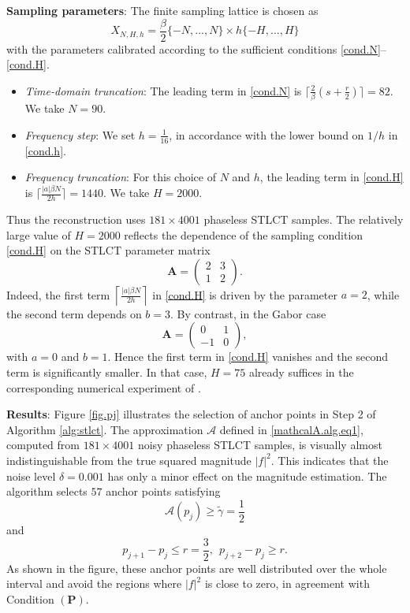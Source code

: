 \documentclass[11pt, reqno]{amsart}
\numberwithin{equation}{section}
\begin{document}
\medskip
\noindent\textbf{Sampling parameters}:  
The finite sampling lattice is chosen as 
$$X_{N,H,h} = \frac{\beta}{2}\{-N,\dots,N\} \times h\{-H,\dots,H\}$$
with the parameters calibrated according to the sufficient conditions
\eqref{cond.N}--\eqref{cond.H}.

\begin{itemize}
    

\item \emph{Time-domain truncation}: The leading term in \eqref{cond.N} is 
  $\lceil\frac{2}{\beta}(s+\frac{r}{2})\rceil = 82$. We take $N = 90$.

\item \emph{Frequency step}: We set $h = \frac{1}{16}$,
in accordance with  the lower bound on $1/h$ in \eqref{cond.h}.

\item \emph{Frequency truncation}: For this choice of $N$ and $h$, the leading term in \eqref{cond.H} is 
  $\lceil\frac{|a|\beta N}{2h}\rceil = 1440$. We take $H = 2000$.
\end{itemize}

Thus the reconstruction uses $181 \times 4001$ phaseless STLCT samples. 
The relatively large value of $H=2000$ reflects the dependence of the sampling condition \eqref{cond.H} on the STLCT parameter matrix 
$$\mathbf A=
\begin{pmatrix}
2 & 3\\
1 & 2
\end{pmatrix}.$$
 Indeed, the first term $\left\lceil \frac{|a|\beta N}{2h}\right\rceil$ in \eqref{cond.H} is driven by the parameter $a=2$, while the second term depends on $b=3$. By contrast, in the Gabor case
$$\mathbf A=
\begin{pmatrix}
0 & 1\\
-1 & 0
\end{pmatrix},$$
 with $a=0$ and $b=1$. Hence the first term in \eqref{cond.H} vanishes and the second term is significantly smaller. In that case, $H=75$ already suffices in the corresponding numerical experiment of \cite{grohs2024stable}.


\medskip
\noindent\textbf{Results}: Figure \ref{fig.pj} illustrates the selection of anchor points in Step 2 of Algorithm \ref{alg:stlct}. The approximation $\mathcal A$ defined in \eqref{mathcalA.alg.eq1}, computed from $181\times 4001$ noisy phaseless STLCT samples, is visually almost indistinguishable from the true squared magnitude $|f|^2$. This indicates that the noise level $\delta=0.001$ has only a minor effect on the magnitude estimation. The algorithm selects $57$ anchor points satisfying
$$\mathcal A(p_j)\ge \widetilde{\gamma}=\frac12$$
and
$$p_{j+1}-p_j\le r=\frac32, \ \  p_{j+2}-p_j\ge r. $$
As shown in the figure, these anchor points are well distributed over the whole interval and avoid the regions where $|f|^2$ is close to zero, in agreement with Condition $(\mathbf P)$.
\end{document}
